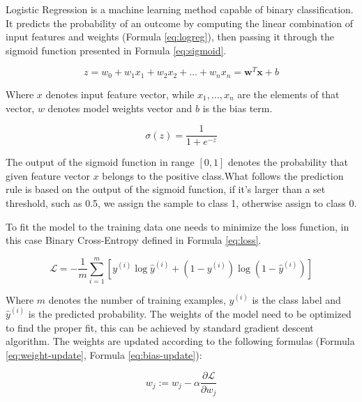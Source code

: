 \documentclass[12pt]{article}
\begin{document}

Logistic Regression is a machine learning method capable of binary classification. It predicts the probability of an outcome by computing the linear combination of input features and weights (Formula \ref{eq:logreg}), then passing it through the sigmoid function presented in Formula \ref{eq:sigmoid}. 

\begin{equation}\label{eq:logreg}
    z = w_0 + w_1 x_1 + w_2 x_2 + \dots + w_n x_n = \mathbf{w}^T \mathbf{x} + b    
\end{equation}


Where $x$ denotes input feature vector, while $x_1,...,x_n$ are the elements of that vector, $w$ denotes model weights vector and $b$ is the bias term.  



\begin{equation}\label{eq:sigmoid}
    \sigma(z) = \frac{1}{1 + e^{-z}}
\end{equation}

The output of the sigmoid function in range $[0,1]$ denotes the probability that given feature vector $x$ belongs to the positive class.What follows the prediction rule is based on the output of the sigmoid function, if it's larger than a set threshold, such as 0.5, we assign the sample to class 1, otherwise assign to class 0.

To fit the model to the training data one needs to minimize the loss function, in this case Binary Cross-Entropy defined in Formula \ref{eq:loss}.

\begin{equation}\label{eq:loss}
    \mathcal{L} = -\frac{1}{m} \sum_{i=1}^{m} \left[ y^{(i)} \log \hat{y}^{(i)} + \left(1 - y^{(i)}\right) \log \left(1 - \hat{y}^{(i)}\right) \right]
\end{equation}


Where $m$ denotes the number of training examples, $y^{(i)}$ is the class label and $\hat{y}^{(i)}$ is the predicted probability. The weights of the model need to be optimized to find the proper fit, this can be achieved by standard gradient descent algorithm. The weights are updated according to the following formulas (Formula \ref{eq:weight-update}, Formula \ref{eq:bias-update}):


\begin{equation}\label{eq:weight-update}
    w_j := w_j - \alpha \frac{\partial \mathcal{L}}{\partial w_j}
\end{equation}
\end{document}
